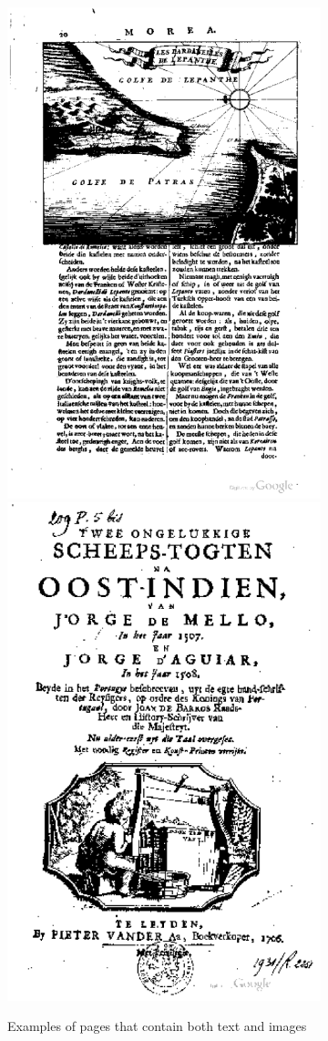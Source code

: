 \appendixpage

\begin{figure}[H]
	\centering
	\begin{subfigure}[b]{0.49\textwidth}
		\includegraphics[width=.49\textwidth]{resources/pageImageExample}
		\includegraphics[width=.49\textwidth]{resources/pageImageExample2}
		\caption{Examples of pages that contain both text and images}
		\label{fig:textImageExamples}
	\end{subfigure}
	\begin{subfigure}[b]{0.49\textwidth}

\end{subfigure}
\end{figure}

